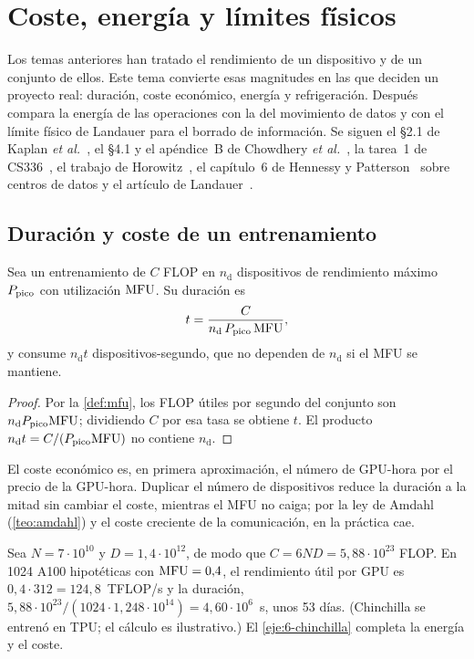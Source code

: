 \chapter{Coste, energía y límites físicos}
\label{tema:6}

Los temas anteriores han tratado el rendimiento de un dispositivo y de un conjunto de ellos. Este tema convierte esas magnitudes en las que deciden un proyecto real: duración, coste económico, energía y refrigeración. Después compara la energía de las operaciones con la del movimiento de datos y con el límite físico de Landauer para el borrado de información. Se siguen el §2.1 de Kaplan \emph{et al.}~\cite{kaplan}, el §4.1 y el apéndice~B de Chowdhery \emph{et al.}~\cite{palm}, la tarea~1 de CS336~\cite[§4.3]{cs336a1}, el trabajo de Horowitz~\cite{horowitz}, el capítulo~6 de Hennessy y Patterson~\cite{hp} sobre centros de datos y el artículo de Landauer~\cite{landauer}.

\section{Duración y coste de un entrenamiento}

\begin{proposicion}\label{prop:duracion}
Sea un entrenamiento de $C$ FLOP en $n_{\mathrm{d}}$ dispositivos de rendimiento máximo $P_{\mathrm{pico}}$ con utilización $\mathrm{MFU}$. Su duración es
\[
t=\frac{C}{n_{\mathrm{d}}\,P_{\mathrm{pico}}\,\mathrm{MFU}},
\]
y consume $n_{\mathrm{d}}t$ dispositivos-segundo, que no dependen de $n_{\mathrm{d}}$ si el MFU se mantiene.
\end{proposicion}

\begin{proof}
Por la \cref{def:mfu}, los FLOP útiles por segundo del conjunto son $n_{\mathrm{d}}P_{\mathrm{pico}}\mathrm{MFU}$; dividiendo $C$ por esa tasa se obtiene $t$. El producto $n_{\mathrm{d}}t=C/(P_{\mathrm{pico}}\mathrm{MFU})$ no contiene $n_{\mathrm{d}}$.
\end{proof}

El coste económico es, en primera aproximación, el número de GPU-hora por el precio de la GPU-hora. Duplicar el número de dispositivos reduce la duración a la mitad sin cambiar el coste, mientras el MFU no caiga; por la ley de Amdahl (\cref{teo:amdahl}) y el coste creciente de la comunicación, en la práctica cae.

\begin{ejemplo}\label{ej:chinchilla}
Sea $N=7\cdot 10^{10}$ y $D=1{,}4\cdot 10^{12}$, de modo que $C=6ND=5{,}88\cdot 10^{23}$ FLOP. En 1024 A100 hipotéticas con $\mathrm{MFU}=0{,}4$, el rendimiento útil por GPU es $0{,}4\cdot 312=124{,}8$~TFLOP/s y la duración, $5{,}88\cdot 10^{23}/(1024\cdot 1{,}248\cdot 10^{14})=4{,}60\cdot 10^{6}$~s, unos 53 días. (Chinchilla se entrenó en TPU; el cálculo es ilustrativo.) El \cref{eje:6-chinchilla} completa la energía y el coste.
\end{ejemplo}

